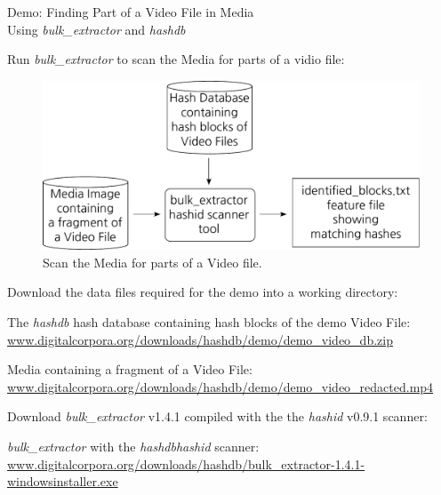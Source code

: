 \documentclass[12pt,twoside]{article}
\newcommand{\hdb}{\emph{hashdb}\xspace}
\newcommand{\bulk}{\emph{bulk\_extractor}\xspace}
\newcommand{\hashid}{\emph{hashid}\xspace}
\begin{document}
\begin{center}
\Large Demo: Finding Part of a Video File in Media \\
\large Using \bulk and \hdb
\end{center}

Run \bulk to scan the Media for parts of a vidio file:

\begin{figure}[H]
  \center
  \includegraphics[scale=0.6]{drawings/scan_hashid}
  \caption*{Scan the Media for parts of a Video file.}
  \label{fig:scan_hashid}
\end{figure}

Download the data files required for the demo into a working directory:
\begin{compactitem}
\item The \hdb hash database containing hash blocks of the demo Video File:
\url{www.digitalcorpora.org/downloads/hashdb/demo/demo\_video\_db.zip}
\item Media containing a fragment of a Video File:
\url{www.digitalcorpora.org/downloads/hashdb/demo/demo\_video\_redacted.mp4}
\end{compactitem}
Download \bulk v1.4.1 compiled with the the \hashid v0.9.1 scanner:
\begin{compactitem}
\item \bulk with the \hdb \hashid scanner:
\url{www.digitalcorpora.org/downloads/hashdb/bulk\_extractor-1.4.1-windowsinstaller.exe}
\end{compactitem}
\end{document}
